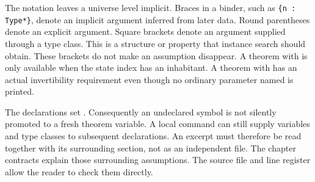 The notation  leaves a universe level implicit. Braces in a binder, such as \texttt{\{n : Type*\}}, denote an implicit argument inferred from later data. Round parentheses denote an explicit argument. Square brackets denote an argument supplied through a type class. This is a structure or property that instance search should obtain. These brackets do not make an assumption disappear. A theorem with \mbox{\code{[Nonempty n]}} is only available when the state index has an inhabitant. A theorem with \code{[Invertible D]} has an actual invertibility requirement even though no ordinary parameter named  is printed.

The declarations set . Consequently an undeclared symbol is not silently promoted to a fresh theorem variable. A local  command can still supply variables and type classes to subsequent declarations. An excerpt must therefore be read together with its surrounding section, not as an independent file. The chapter contracts explain those surrounding assumptions. The source file and line register allow the reader to check them directly.

